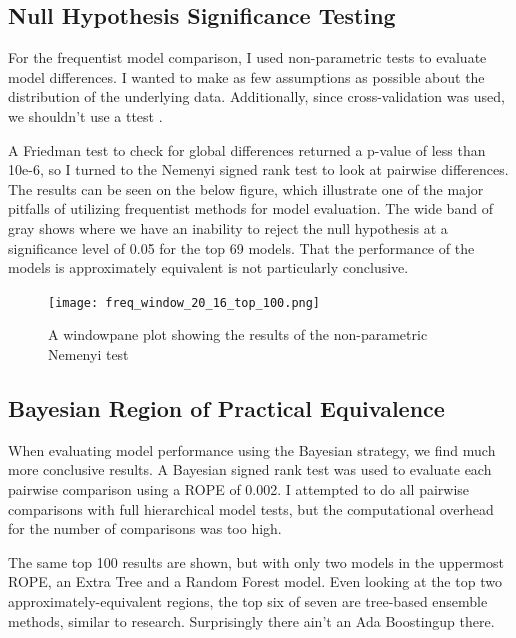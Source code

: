 \documentclass{article}
\begin{document}
    \subsection{Null Hypothesis Significance Testing}
        For the frequentist model comparison, I used non-parametric tests to evaluate model differences.
        I wanted to make as few assumptions as possible about the distribution of the underlying data.
        Additionally, since cross-validation was used, we shouldn't use a ttest \cite{why2009, eval2018}.
        
        A Friedman test \cite{scipy, eval2018} to check for global differences returned a p-value of less than 10e-6, so I turned to the Nemenyi signed rank test \cite{scipy, eval2018} to look at pairwise differences.
        The results can be seen on the below figure, which illustrate one of the major pitfalls of utilizing frequentist methods for model evaluation.
        The wide band of gray shows where we have an inability to reject the null hypothesis at a significance level of 0.05 for the top 69 models.
        That the performance of the models is approximately equivalent is not particularly conclusive. 

        \begin{figure}
            \centering
            \texttt{[image: freq\_window\_20\_16\_top\_100.png]}
            \caption{A windowpane plot showing the results of the non-parametric Nemenyi test}
            \label{fig:freq_window_20_16_top_100}
        \end{figure}

    \subsection{Bayesian Region of Practical Equivalence}
        When evaluating model performance using the Bayesian strategy, we find much more conclusive results.
        A Bayesian signed rank test \cite{stat2017, eval2018, time2017} was used to evaluate each pairwise comparison using a ROPE of 0.002.
        I attempted to do all pairwise comparisons with full hierarchical model tests, but the computational overhead for the number of comparisons was too high.
        
        The same top 100 results are shown, but with only two models in the uppermost ROPE, an Extra Tree and a Random Forest model.
        Even looking at the top two approximately-equivalent regions, the top six of seven are tree-based ensemble methods, similar to research.
        Surprisingly there ain't an Ada Boostingup there.
\end{document}
